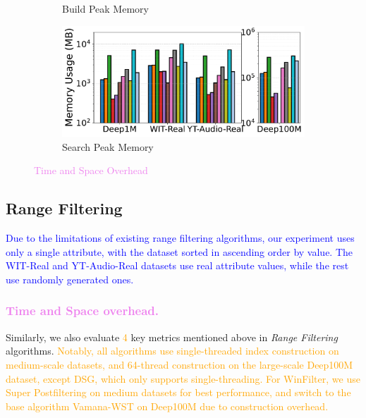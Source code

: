 \documentclass[sigconf, nonacm]{acmart}
\begin{document}
{\begin{figure}[t]
\begin{subfigure}[t]{0.495\columnwidth}
			\caption{\footnotesize Build Peak Memory}
			\label{fig:rangeFilter_build_memory_mb}
		\end{subfigure}
		\hfill
		\begin{subfigure}[t]{0.495\columnwidth}
			\centering
			\includegraphics[width=\linewidth]{figures/searchMem/range_memory_comparison.pdf}
			\caption{\footnotesize Search Peak Memory}
			\label{fig:rangeFilter_search_memory_mb}
		\end{subfigure}
		
		\caption{\textcolor{violet}{Time and Space Overhead}}
		\label{fig:rangeFilter_build_index_comparison}
	\end{figure}
	\subsection{Range Filtering}
	\textcolor{blue}{Due to the limitations of existing range filtering algorithms, our experiment uses only a single attribute, with the dataset sorted in ascending order by value. The WIT-Real and YT-Audio-Real datasets use real attribute values, while the rest use randomly generated ones. }
	\subsubsection{\textcolor{violet}{Time and Space overhead.}}
	
	Similarly, we also evaluate \textcolor{orange}{4} key metrics mentioned above in \textit{Range Filtering} algorithms. \textcolor{orange}{Notably, all algorithms use single-threaded index construction on medium-scale datasets, and 64-thread construction on the large-scale Deep100M dataset, except DSG, which only supports single-threading. For WinFilter, we use Super Postfiltering on medium datasets for best performance, and switch to the base algorithm Vamana-WST on Deep100M due to construction overhead.
	}
	
}
\end{document}
